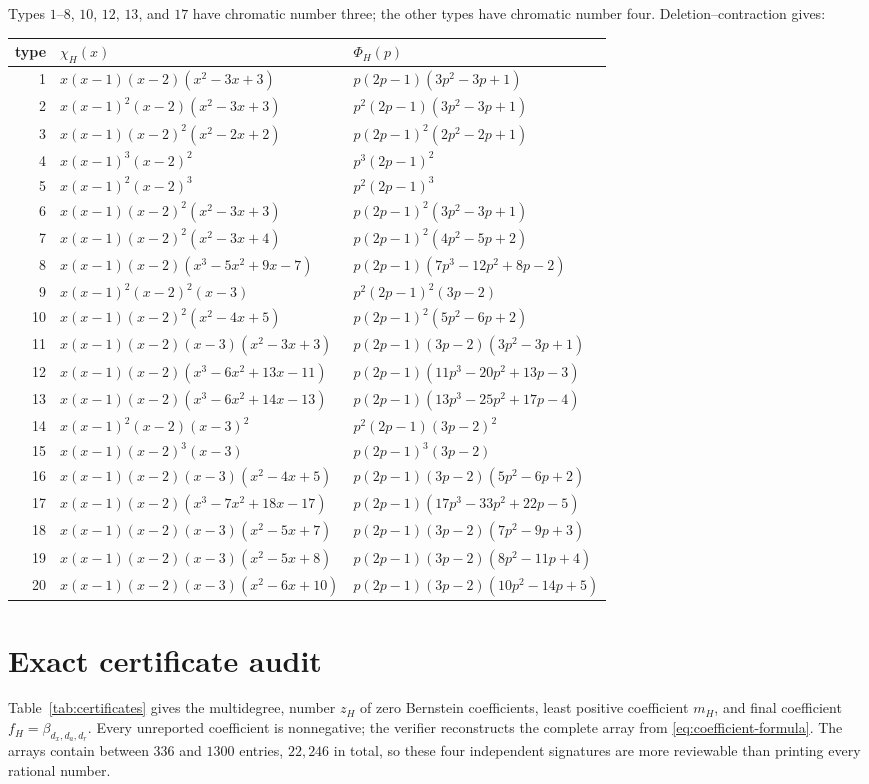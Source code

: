 \documentclass[11pt]{article}
\begin{document}
Types $1$--$8$, $10$, $12$, $13$, and $17$ have chromatic number three;
the other types have chromatic number four.  Deletion--contraction gives:

\scriptsize
\begin{longtable}{r@{\quad}p{7.1cm}p{7.1cm}}
type&$\chi_H(x)$&$\Phi_H(p)$\\ \hline
1&$x(x-1)(x-2)(x^2-3x+3)$&$p(2p-1)(3p^2-3p+1)$\\
2&$x(x-1)^2(x-2)(x^2-3x+3)$&$p^2(2p-1)(3p^2-3p+1)$\\
3&$x(x-1)(x-2)^2(x^2-2x+2)$&$p(2p-1)^2(2p^2-2p+1)$\\
4&$x(x-1)^3(x-2)^2$&$p^3(2p-1)^2$\\
5&$x(x-1)^2(x-2)^3$&$p^2(2p-1)^3$\\
6&$x(x-1)(x-2)^2(x^2-3x+3)$&$p(2p-1)^2(3p^2-3p+1)$\\
7&$x(x-1)(x-2)^2(x^2-3x+4)$&$p(2p-1)^2(4p^2-5p+2)$\\
8&$x(x-1)(x-2)(x^3-5x^2+9x-7)$&$p(2p-1)(7p^3-12p^2+8p-2)$\\
9&$x(x-1)^2(x-2)^2(x-3)$&$p^2(2p-1)^2(3p-2)$\\
10&$x(x-1)(x-2)^2(x^2-4x+5)$&$p(2p-1)^2(5p^2-6p+2)$\\
11&$x(x-1)(x-2)(x-3)(x^2-3x+3)$&$p(2p-1)(3p-2)(3p^2-3p+1)$\\
12&$x(x-1)(x-2)(x^3-6x^2+13x-11)$&$p(2p-1)(11p^3-20p^2+13p-3)$\\
13&$x(x-1)(x-2)(x^3-6x^2+14x-13)$&$p(2p-1)(13p^3-25p^2+17p-4)$\\
14&$x(x-1)^2(x-2)(x-3)^2$&$p^2(2p-1)(3p-2)^2$\\
15&$x(x-1)(x-2)^3(x-3)$&$p(2p-1)^3(3p-2)$\\
16&$x(x-1)(x-2)(x-3)(x^2-4x+5)$&$p(2p-1)(3p-2)(5p^2-6p+2)$\\
17&$x(x-1)(x-2)(x^3-7x^2+18x-17)$&$p(2p-1)(17p^3-33p^2+22p-5)$\\
18&$x(x-1)(x-2)(x-3)(x^2-5x+7)$&$p(2p-1)(3p-2)(7p^2-9p+3)$\\
19&$x(x-1)(x-2)(x-3)(x^2-5x+8)$&$p(2p-1)(3p-2)(8p^2-11p+4)$\\
20&$x(x-1)(x-2)(x-3)(x^2-6x+10)$&$p(2p-1)(3p-2)(10p^2-14p+5)$
\end{longtable}
\normalsize


\section{Exact certificate audit}

Table~\ref{tab:certificates} gives the multidegree, number $z_H$ of zero
Bernstein coefficients, least positive coefficient $m_H$, and final
coefficient $f_H=\beta_{d_x,d_a,d_r}$.  Every unreported coefficient is
nonnegative; the verifier reconstructs the complete array from
\eqref{eq:coefficient-formula}.  The arrays contain between $336$ and $1300$
entries, $22{,}246$ in total, so these four independent signatures are more
reviewable than printing every rational number.
\end{document}
